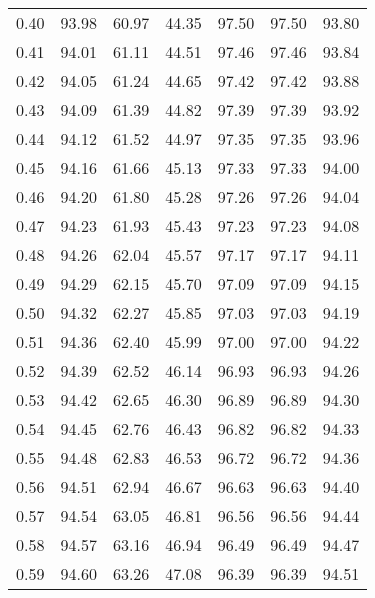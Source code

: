 \begin{tabular}{|c|c|c|c|c|c|c|}
      0.40 &     93.98 &     60.97 &      44.35 &   97.50 &      97.50 &         93.80 \\
      0.41 &     94.01 &     61.11 &      44.51 &   97.46 &      97.46 &         93.84 \\
      0.42 &     94.05 &     61.24 &      44.65 &   97.42 &      97.42 &         93.88 \\
      0.43 &     94.09 &     61.39 &      44.82 &   97.39 &      97.39 &         93.92 \\
      0.44 &     94.12 &     61.52 &      44.97 &   97.35 &      97.35 &         93.96 \\
      0.45 &     94.16 &     61.66 &      45.13 &   97.33 &      97.33 &         94.00 \\
      0.46 &     94.20 &     61.80 &      45.28 &   97.26 &      97.26 &         94.04 \\
      0.47 &     94.23 &     61.93 &      45.43 &   97.23 &      97.23 &         94.08 \\
      0.48 &     94.26 &     62.04 &      45.57 &   97.17 &      97.17 &         94.11 \\
      0.49 &     94.29 &     62.15 &      45.70 &   97.09 &      97.09 &         94.15 \\
      0.50 &     94.32 &     62.27 &      45.85 &   97.03 &      97.03 &         94.19 \\
      0.51 &     94.36 &     62.40 &      45.99 &   97.00 &      97.00 &         94.22 \\
      0.52 &     94.39 &     62.52 &      46.14 &   96.93 &      96.93 &         94.26 \\
      0.53 &     94.42 &     62.65 &      46.30 &   96.89 &      96.89 &         94.30 \\
      0.54 &     94.45 &     62.76 &      46.43 &   96.82 &      96.82 &         94.33 \\
      0.55 &     94.48 &     62.83 &      46.53 &   96.72 &      96.72 &         94.36 \\
      0.56 &     94.51 &     62.94 &      46.67 &   96.63 &      96.63 &         94.40 \\
      0.57 &     94.54 &     63.05 &      46.81 &   96.56 &      96.56 &         94.44 \\
      0.58 &     94.57 &     63.16 &      46.94 &   96.49 &      96.49 &         94.47 \\
      0.59 &     94.60 &     63.26 &      47.08 &   96.39 &      96.39 &         94.51 \\

\end{tabular}
